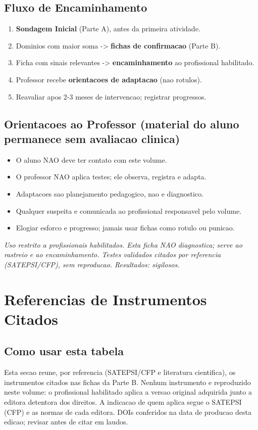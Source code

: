 \documentclass[a4paper,11pt]{book}
\newcommand{\avisolegal}{\par\medskip\noindent\footnotesize\itshape
\color{cinza}Uso restrito a profissionais habilitados. Esta ficha NAO diagnostica;
serve ao rastreio e ao encaminhamento. Testes validados citados por referencia
(SATEPSI/CFP), sem reproducao. Resultados: sigilosos.\color{black}\par}
\begin{document}
\section{Fluxo de Encaminhamento}
\begin{enumerate}[leftmargin=2.2em]
\item \textbf{Sondagem Inicial} (Parte A), antes da primeira atividade.
\item Dominios com maior soma -> \textbf{fichas de confirmacao} (Parte B).
\item Ficha com sinais relevantes -> \textbf{encaminhamento} ao profissional habilitado.
\item Professor recebe \textbf{orientacoes de adaptacao} (nao rotulos).
\item Reavaliar apos 2-3 meses de intervencao; registrar progressos.
\end{enumerate}

\section{Orientacoes ao Professor (material do aluno permanece sem avaliacao clinica)}
\begin{itemize}
\item O aluno NAO deve ter contato com este volume.
\item O professor NAO aplica testes; ele observa, registra e adapta.
\item Adaptacoes sao planejamento pedagogico, nao e diagnostico.
\item Qualquer suspeita e comunicada ao profissional responsavel pelo volume.
\item Elogiar esforco e progresso; jamais usar fichas como rotulo ou punicao.
\end{itemize}

\avisolegal


\chapter*{Referencias de Instrumentos Citados}

\section*{Como usar esta tabela}
Esta secao reune, por referencia (SATEPSI/CFP e literatura cientifica), os
instrumentos citados nas fichas da Parte B. Nenhum instrumento e reproduzido
neste volume: o profissional habilitado aplica a versao original adquirida junto
a editora detentora dos direitos. A indicacao de quem aplica segue o SATEPSI
(CFP) e as normas de cada editora. DOIs conferidos na data de producao desta
edicao; revisar antes de citar em laudos.
\end{document}
